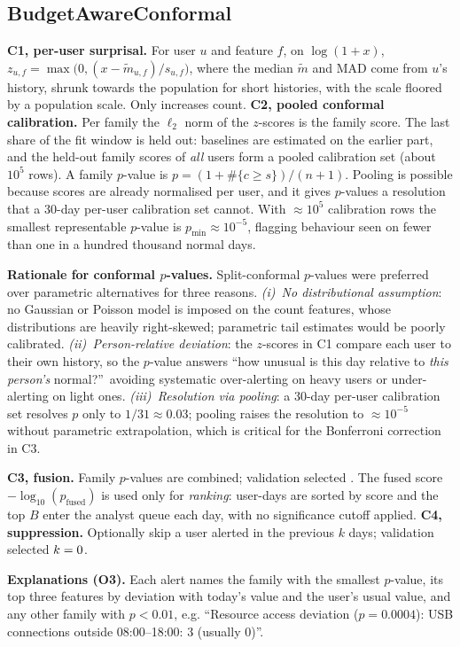 \documentclass[conference]{IEEEtran}
\begin{document}
\subsection{BudgetAwareConformal}
\textbf{C1, per-user surprisal.} For user $u$ and feature $f$, on $\log(1+x)$,
$z_{u,f}=\max\bigl(0,(x-\tilde m_{u,f})/s_{u,f}\bigr)$, where the median $\tilde m$ and MAD come
from $u$'s history, shrunk towards the population for short histories, with the scale floored by a
population scale. Only increases count.
\textbf{C2, pooled conformal calibration.} Per family the $\ell_2$ norm of the $z$-scores is the
family score. The last share of the fit window is held out: baselines are estimated on the earlier
part, and the held-out family scores of \emph{all} users form a pooled calibration set (about
$10^5$ rows). A family $p$-value is $p=(1+\#\{c\ge s\})/(n+1)$. Pooling is possible because scores
are already normalised per user, and it gives $p$-values a resolution that a 30-day per-user
calibration set cannot. With $\approx10^5$ calibration rows the smallest representable $p$-value
is $p_{\min}\approx10^{-5}$, flagging behaviour seen on fewer than one in a hundred thousand
normal days.

\textbf{Rationale for conformal $p$-values.}
Split-conformal $p$-values were preferred over parametric alternatives for three reasons.
\emph{(i)~No distributional assumption}: no Gaussian or Poisson model is imposed on the count
features, whose distributions are heavily right-skewed; parametric tail estimates would be
poorly calibrated.
\emph{(ii)~Person-relative deviation}: the $z$-scores in C1 compare each user to their own
history, so the $p$-value answers ``how unusual is this day relative to \emph{this person's}
normal?''\, avoiding systematic over-alerting on heavy users or under-alerting on light ones.
\emph{(iii)~Resolution via pooling}: a 30-day per-user calibration set resolves $p$ only to
$1/31\approx0.03$; pooling raises the resolution to $\approx10^{-5}$ without parametric
extrapolation, which is critical for the Bonferroni correction in C3.

\textbf{C3, fusion.} Family $p$-values are combined; validation selected \TunedFusion{}. The
fused score $-\log_{10}(p_{\text{fused}})$ is used only for \emph{ranking}: user-days are sorted
by score and the top $B$ enter the analyst queue each day, with no significance cutoff applied.
\textbf{C4, suppression.} Optionally skip a user alerted in the previous $k$ days; validation
selected $k=0$.

\textbf{Explanations (O3).} Each alert names the family with the smallest $p$-value, its top three
features by deviation with today's value and the user's usual value, and any other family with
$p<0.01$, e.g. ``Resource access deviation ($p=0.0004$): USB connections outside 08:00--18:00: 3
(usually 0)''.
\end{document}
